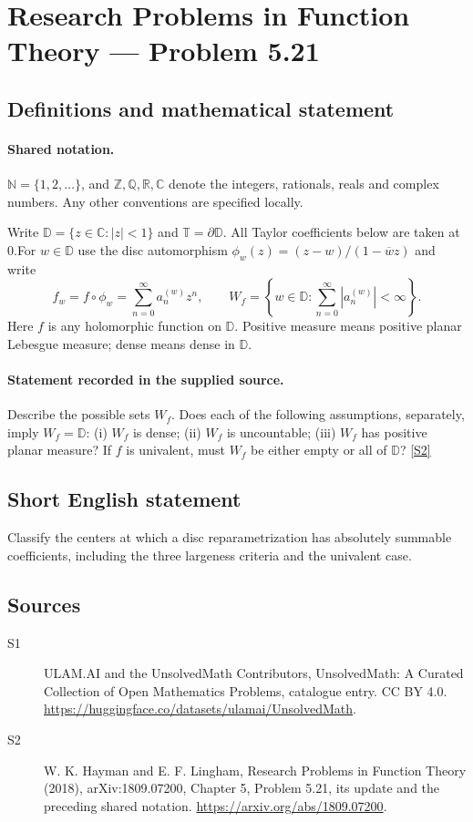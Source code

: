 \documentclass[11pt]{article}
\newcommand{\sref}[2]{\hyperlink{source:#1:#2}{[S#2]}}
\begin{document}
\section{Research Problems in Function Theory — Problem 5.21}\label{statement}

\subsection{Definitions and mathematical statement}

\paragraph{Shared notation.}$\mathbb N=\{1,2,\ldots\}$, and $\mathbb Z,\mathbb Q,\mathbb R,\mathbb C$ denote the integers, rationals, reals and complex numbers. Any other conventions are specified locally.


Write $\mathbb D=\{z\in\mathbb C:|z|<1\}$ and $\mathbb T=\partial\mathbb D$. All Taylor coefficients below are taken at $0$.For $w\in\mathbb D$ use the disc automorphism $\phi_w(z)=(z-w)/(1-\overline w z)$ and write
\[f_w=f\circ\phi_w=\sum_{n=0}^\infty a_n^{(w)}z^n,\qquad
W_f=\left\{w\in\mathbb D:\sum_{n=0}^\infty|a_n^{(w)}|<\infty\right\}.
\]
Here $f$ is any holomorphic function on $\mathbb D$. Positive measure means positive planar Lebesgue measure; dense means dense in $\mathbb D$.
\paragraph{Statement recorded in the supplied source.}
Describe the possible sets $W_f$. Does each of the following assumptions, separately, imply $W_f=\mathbb D$: (i) $W_f$ is dense; (ii) $W_f$ is uncountable; (iii) $W_f$ has positive planar measure? If $f$ is univalent, must $W_f$ be either empty or all of $\mathbb D$? \sref{statement}{2}
\subsection{Short English statement}
Classify the centers at which a disc reparametrization has absolutely summable coefficients, including the three largeness criteria and the univalent case.
\subsection{Sources}
\begin{description}
\item[\hypertarget{source:statement:1}{S1}] ULAM.AI and the UnsolvedMath Contributors, UnsolvedMath: A Curated Collection of Open Mathematics Problems, catalogue entry. CC BY 4.0. \url{https://huggingface.co/datasets/ulamai/UnsolvedMath}.
\item[\hypertarget{source:statement:2}{S2}] W. K. Hayman and E. F. Lingham, Research Problems in Function Theory (2018), arXiv:1809.07200, Chapter 5, Problem 5.21, its update and the preceding shared notation. \url{https://arxiv.org/abs/1809.07200}.
\end{description}
\label{end:statement}
\end{document}
